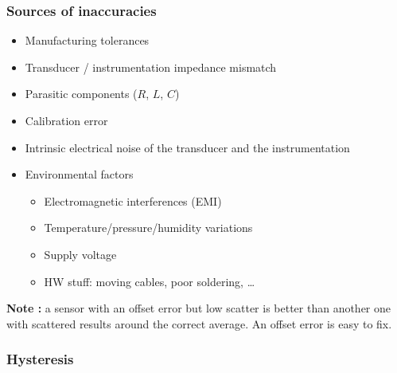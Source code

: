 \subsubsection{Sources of inaccuracies}

\begin{itemize}
    \item Manufacturing tolerances
    \item Transducer / instrumentation impedance mismatch
    \item Parasitic components ($R$, $L$, $C$)
    \item Calibration error
    \item Intrinsic electrical noise of the transducer and the
instrumentation
    \item Environmental factors
    \begin{itemize}
        \item Electromagnetic interferences (EMI)
        \item Temperature/pressure/humidity variations
        \item Supply voltage
        \item HW stuff: moving cables, poor soldering, …
    \end{itemize}
\end{itemize}

\textbf{Note :} a sensor with an offset error but low scatter is better than another one with scattered results around the correct average. An offset error is easy to fix.

\subsubsection{Hysteresis}


